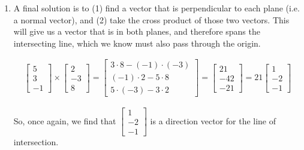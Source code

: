 \documentclass[11pt]{article}
\begin{document}
\begin{prob}[(12 pts)]
\begin{subprob}
\begin{solution}
\begin{enumerate}
    Therefore, the parametric equation of the line is

    $$L = t \begin{bmatrix} -3 \\ 6 \\ 3 \end{bmatrix}, \quad t \in \mathbb{R}$$

    which is equivalent to

    $$L = t \begin{bmatrix} 1 \\ -2 \\ -1 \end{bmatrix}, \quad t \in \mathbb{R}$$

    This is the same line we found earlier, just with a scaled direction vector, which doesn't change the line.

    \item A final solution is to (1) find a vector that is perpendicular to each plane (i.e. a normal vector), and (2) take the cross product of those two vectors. This will give us a vector that is in both planes, and therefore spans the intersecting line, which we know must also pass through the origin.
    
    \begin{align*}
        \begin{bmatrix} 5 \\ 3 \\ -1 \end{bmatrix} \times \begin{bmatrix} 2 \\ -3 \\ 8 \end{bmatrix} = \begin{bmatrix} 3 \cdot 8 - (-1) \cdot (-3) \\ (-1) \cdot 2 - 5 \cdot 8 \\ 5 \cdot (-3) - 3 \cdot 2 \end{bmatrix} = \begin{bmatrix} 21 \\ -42 \\ -21 \end{bmatrix} = 21 \begin{bmatrix} 1 \\ -2 \\ -1 \end{bmatrix}
    \end{align*}

    So, once again, we find that $\begin{bmatrix} 1 \\ -2 \\ -1 \end{bmatrix}$ is a direction vector for the line of intersection.

\end{enumerate}

\end{solution}

\end{subprob}

\end{prob}
\end{document}
